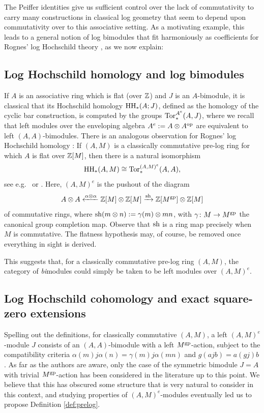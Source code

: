 \documentclass[a4paper,10pt%
]{amsart}
\numberwithin{equation}{section}
\theoremstyle{definition}
\renewcommand{\:}{\colon}
\begin{document}
The Peiffer identities give us sufficient control over the lack of commutativity to carry many constructions in classical log geometry that seem to depend upon commutativity over to this associative setting. As a motivating example, this leads to a general notion of log bimodules that fit harmoniously as coefficients for Rognes' log Hochschild theory 
\cite{Rog09}, as we now explain:

\subsection{Log Hochschild homology and log bimodules} If $A$ is an associative ring which is flat (over ${\Bbb Z}$) and $J$ is an $A$-bimodule, it is classical that its Hochschild homology ${\rm HH}_*(A ; J)$, defined as the homology of the cyclic bar construction, is computed by the groups ${\rm Tor}_*^{A^e}(A, J)$, where we recall that left modules over the enveloping algebra $A^e := A \otimes A^{\rm op}$ are equivalent to left $(A, A)$-bimodules. There is an analogous observation for Rognes' log Hochschild homology \cite[Definition 3.23]{Rog09}: If $(A, M)$ is a classically commutative pre-log ring for which $A$ is flat over ${\Bbb Z}[M]$, then there is a natural isomorphism \begin{equation}\label{eq:loghhtor}{\rm HH}_*(A, M) \cong {\rm Tor}_*^{(A, M)^e}(A, A),\end{equation} see e.g.\ \cite[Section 13]{Rog09} or \cite[Proposition 1.4]{BLPO23a}. Here, $(A, M)^e$ is the pushout of the diagram \begin{equation}\label{eq:reppush}A \otimes A \xleftarrow{\alpha \otimes \alpha} {\Bbb Z}[M] \otimes {\Bbb Z}[M] \xrightarrow{{\rm sh}} {\Bbb Z}[M^{\rm gp}] \otimes {\Bbb Z}[M]\end{equation} of commutative rings, where ${\rm sh}(m \otimes n) := \gamma(m) \otimes mn$, with $\gamma \colon M \to M^{\rm gp}$ the canonical group completion map. Observe that ${\rm sh}$ is a ring map precisely when $M$ is commutative. The flatness hypothesis may, of course, be removed once everything in sight is derived. 

This suggests that, for a classically commutative pre-log ring $(A, M)$, the category of \emph{bi}modules could simply be taken to be left modules over $(A, M)^e$. 

\subsection{Log Hochschild cohomology and exact square-zero extensions} Spelling out the definitions, for classically commutative $(A, M)$, a left $(A, M)^e$-module $J$ consists of an $(A, A)$-bimodule with a left $M^{\rm gp}$-action, subject to the compatibility criteria $\alpha(m)j\alpha(n) = \gamma(m)j\alpha(mn)$ and $g(ajb) = a(gj)b$. As far as the authors are aware, only the case of the symmetric bimodule $J = A$ with trivial $M^{\rm gp}$-action has been considered in the literature up to this point. We believe that this has obscured some structure that is very natural to consider in this context, and studying properties of $(A, M)^e$-modules eventually led us to propose Definition \ref{def:prelog}. 
\end{document}
